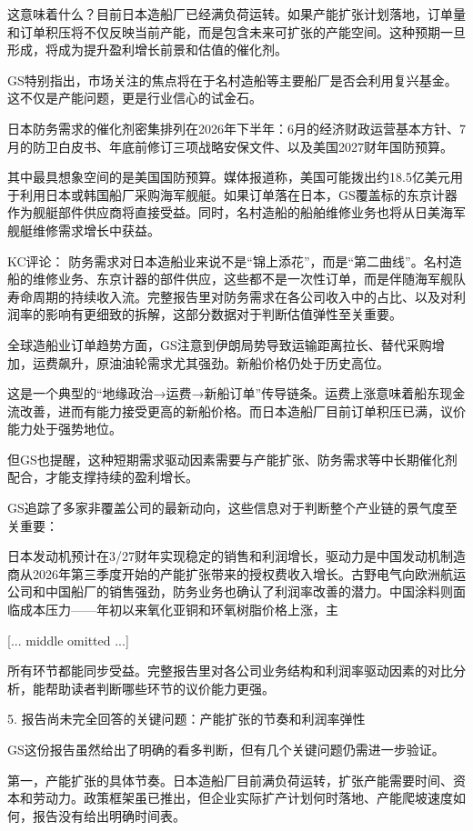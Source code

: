 \documentclass[11pt]{ctexart}
\begin{document}
这意味着什么？目前日本造船厂已经满负荷运转。如果产能扩张计划落地，订单量和订单积压将不仅反映当前产能，而是包含未来可扩张的产能空间。这种预期一旦形成，将成为提升盈利增长前景和估值的催化剂。

GS特别指出，市场关注的焦点将在于名村造船等主要船厂是否会利用复兴基金。这不仅是产能问题，更是行业信心的试金石。

日本防务需求的催化剂密集排列在2026年下半年：6月的经济财政运营基本方针、7月的防卫白皮书、年底前修订三项战略安保文件、以及美国2027财年国防预算。

其中最具想象空间的是美国国防预算。媒体报道称，美国可能拨出约18.5亿美元用于利用日本或韩国船厂采购海军舰艇。如果订单落在日本，GS覆盖标的东京计器作为舰艇部件供应商将直接受益。同时，名村造船的船舶维修业务也将从日美海军舰艇维修需求增长中获益。

KC评论： 防务需求对日本造船业来说不是“锦上添花”，而是“第二曲线”。名村造船的维修业务、东京计器的部件供应，这些都不是一次性订单，而是伴随海军舰队寿命周期的持续收入流。完整报告里对防务需求在各公司收入中的占比、以及对利润率的影响有更细致的拆解，这部分数据对于判断估值弹性至关重要。

全球造船业订单趋势方面，GS注意到伊朗局势导致运输距离拉长、替代采购增加，运费飙升，原油油轮需求尤其强劲。新船价格仍处于历史高位。

这是一个典型的“地缘政治→运费→新船订单”传导链条。运费上涨意味着船东现金流改善，进而有能力接受更高的新船价格。而日本造船厂目前订单积压已满，议价能力处于强势地位。

但GS也提醒，这种短期需求驱动因素需要与产能扩张、防务需求等中长期催化剂配合，才能支撑持续的盈利增长。

GS追踪了多家非覆盖公司的最新动向，这些信息对于判断整个产业链的景气度至关重要：

日本发动机预计在3/27财年实现稳定的销售和利润增长，驱动力是中国发动机制造商从2026年第三季度开始的产能扩张带来的授权费收入增长。古野电气向欧洲航运公司和中国船厂的销售强劲，防务业务也确认了利润率改善的潜力。中国涂料则面临成本压力——年初以来氧化亚铜和环氧树脂价格上涨，主

[... middle omitted ...]

所有环节都能同步受益。完整报告里对各公司业务结构和利润率驱动因素的对比分析，能帮助读者判断哪些环节的议价能力更强。

5. 报告尚未完全回答的关键问题：产能扩张的节奏和利润率弹性

GS这份报告虽然给出了明确的看多判断，但有几个关键问题仍需进一步验证。

第一，产能扩张的具体节奏。日本造船厂目前满负荷运转，扩张产能需要时间、资本和劳动力。政策框架虽已推出，但企业实际扩产计划何时落地、产能爬坡速度如何，报告没有给出明确时间表。
\end{document}
